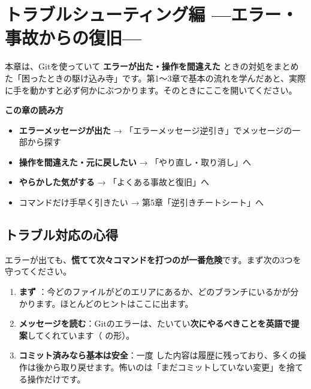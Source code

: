 \chapter{トラブルシューティング編 —エラー・事故からの復旧—}

本章は、Gitを使っていて \textbf{エラーが出た・操作を間違えた} ときの対処をまとめた「困ったときの駆け込み寺」です。第1〜3章で基本の流れを学んだあと、実際に手を動かすと必ず何かにぶつかります。そのときにここを開いてください。

\begin{hintbox}
\textbf{この章の読み方}
\begin{itemize}[leftmargin=1.4em, nosep]
  \item \textbf{エラーメッセージが出た} → 「エラーメッセージ逆引き」でメッセージの一部から探す
  \item \textbf{操作を間違えた・元に戻したい} → 「やり直し・取り消し」へ
  \item \textbf{やらかした気がする} → 「よくある事故と復旧」へ
  \item コマンドだけ手早く引きたい → 第5章「逆引きチートシート」へ
\end{itemize}
\end{hintbox}

\section{トラブル対応の心得}

エラーが出ても、\textbf{慌てて次々コマンドを打つのが一番危険}です。まず次の3つを守ってください。

\begin{enumerate}[leftmargin=1.6em]
  \item \textbf{まず }：今どのファイルがどのエリアにあるか、どのブランチにいるかが分かります。ほとんどのヒントはここに出ます。
  \item \textbf{メッセージを読む}：Gitのエラーは、たいてい\textbf{次にやるべきことを英語で提案}してくれています（ の形）。
  \item \textbf{コミット済みなら基本は安全}：一度  した内容は履歴に残っており、多くの操作は後から取り戻せます。怖いのは「まだコミットしていない変更」を捨てる操作だけです。
\end{enumerate}

